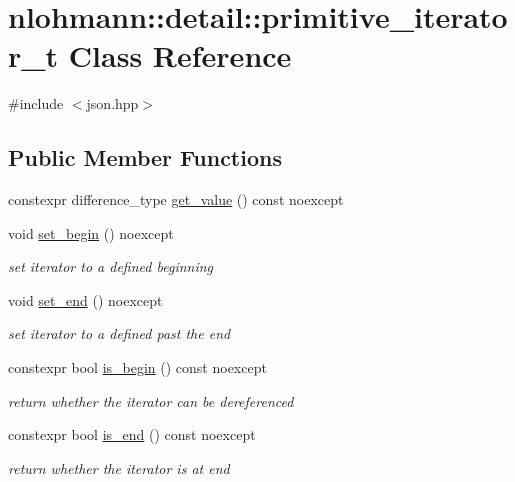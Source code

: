 \hypertarget{classnlohmann_1_1detail_1_1primitive__iterator__t}{}\section{nlohmann\+:\+:detail\+:\+:primitive\+\_\+iterator\+\_\+t Class Reference}
\label{classnlohmann_1_1detail_1_1primitive__iterator__t}


{\ttfamily \#include $<$json.\+hpp$>$}

\subsection*{Public Member Functions}
\begin{DoxyCompactItemize}
\item 
constexpr difference\+\_\+type \hyperlink{classnlohmann_1_1detail_1_1primitive__iterator__t_ae952990886ca1756229f916661a8af81}{get\+\_\+value} () const noexcept
\item 
void \hyperlink{classnlohmann_1_1detail_1_1primitive__iterator__t_a9d9b005906106e12aed738f97d7fee42}{set\+\_\+begin} () noexcept
\begin{DoxyCompactList}\small\item\em set iterator to a defined beginning \end{DoxyCompactList}\item 
void \hyperlink{classnlohmann_1_1detail_1_1primitive__iterator__t_ad26a823483846a12d890c3feed3097eb}{set\+\_\+end} () noexcept
\begin{DoxyCompactList}\small\item\em set iterator to a defined past the end \end{DoxyCompactList}\item 
constexpr bool \hyperlink{classnlohmann_1_1detail_1_1primitive__iterator__t_a8d1a7d46b3fcd06edd034f04ededb5e4}{is\+\_\+begin} () const noexcept
\begin{DoxyCompactList}\small\item\em return whether the iterator can be dereferenced \end{DoxyCompactList}\item 
constexpr bool \hyperlink{classnlohmann_1_1detail_1_1primitive__iterator__t_a45a7e301c23b5b90417baf2277f40b1d}{is\+\_\+end} () const noexcept
\begin{DoxyCompactList}\small\item\em return whether the iterator is at end \end{DoxyCompactList}\item 

\end{DoxyCompactItemize}
